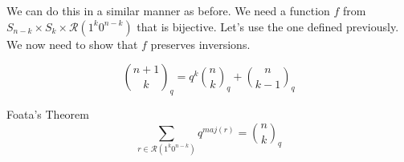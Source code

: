 \documentclass[crop=false,class=book,oneside]{standalone}
\begin{document}
        We can do this in a similar manner as before. We need a
        function $f$ from
        $S_{n-k}\times{S}_{k}\times\mathcal{R}(1^{k}0^{n-k})$ that
        is bijective. Let's use the one defined previously. We
        now need to show that $f$ preserves inversions.
        \begin{theorem}
            \begin{equation}
                \binom{n+1}{k}_{q}=
                q^{k}\binom{n}{k}_{q}+
                \binom{n}{k-1}_{q}
            \end{equation}
        \end{theorem}
        \begin{ltheorem}{Foata's Theorem}
            \begin{equation}
                \sum_{r\in\mathcal{R}(1^{k}0^{n-k})}q^{maj(r)}
                =\binom{n}{k}_{q}
            \end{equation}
        \end{ltheorem}
\end{document}
